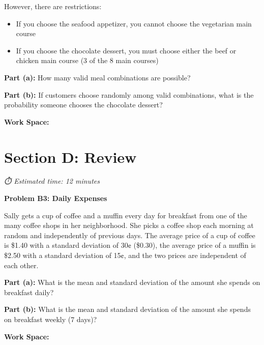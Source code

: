 \documentclass[
  11pt,
]{article}
\begin{document}
However, there are restrictions:

\begin{itemize}
\item
  If you choose the seafood appetizer, you cannot choose the vegetarian
  main course
\item
  If you choose the chocolate dessert, you must choose either the beef
  or chicken main course (3 of the 8 main courses)
\end{itemize}

\textbf{Part (a):} How many valid meal combinations are possible?

\textbf{Part (b):} If customers choose randomly among valid
combinations, what is the probability someone chooses the chocolate
dessert?

\textbf{Work Space:}

\section{Section D: Review}\label{section-d-review}

\emph{⏱️ Estimated time: 12 minutes}

\textbf{Problem B3: Daily Expenses}

Sally gets a cup of coffee and a muffin every day for breakfast from one
of the many coffee shops in her neighborhood. She picks a coffee shop
each morning at random and independently of previous days. The average
price of a cup of coffee is \$1.40 with a standard deviation of 30¢
(\$0.30), the average price of a muffin is \$2.50 with a standard
deviation of 15¢, and the two prices are independent of each other.

\textbf{Part (a):} What is the mean and standard deviation of the amount
she spends on breakfast daily?

\textbf{Part (b):} What is the mean and standard deviation of the amount
she spends on breakfast weekly (7 days)?

\textbf{Work Space:}
\end{document}
